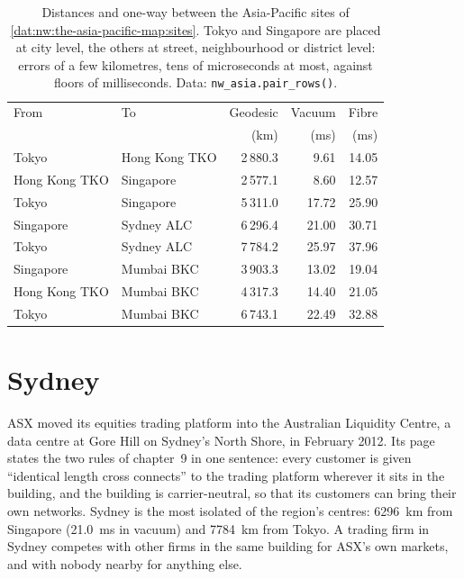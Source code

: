 \begin{table}[ht]
\centering\small
\begin{tabular}{llrrr}
\toprule
From & To & Geodesic & Vacuum & Fibre \\
 & & (km) & (ms) & (ms) \\
\midrule
Tokyo & Hong Kong TKO & 2\,880.3 & 9.61 & 14.05 \\
Hong Kong TKO & Singapore & 2\,577.1 & 8.60 & 12.57 \\
Tokyo & Singapore & 5\,311.0 & 17.72 & 25.90 \\
Singapore & Sydney ALC & 6\,296.4 & 21.00 & 30.71 \\
Tokyo & Sydney ALC & 7\,784.2 & 25.97 & 37.96 \\
Singapore & Mumbai BKC & 3\,903.3 & 13.02 & 19.04 \\
Hong Kong TKO & Mumbai BKC & 4\,317.3 & 14.40 & 21.05 \\
Tokyo & Mumbai BKC & 6\,743.1 & 22.49 & 32.88 \\
\bottomrule
\end{tabular}
\caption{Distances and one-way  between the Asia-Pacific sites of \cref{dat:nw:the-asia-pacific-map:sites}. Tokyo and Singapore
are placed at city level, the others at street, neighbourhood or district level: errors of a few kilometres, tens of microseconds at most, against
floors of milliseconds. Data: \texttt{nw\_asia.pair\_rows()}.}\label{tab:nw:the-asia-pacific-map:pairs}
\end{table}

\section{Sydney}

ASX moved its equities trading platform into the Australian Liquidity Centre, a data centre at Gore Hill on Sydney's North Shore, in
February 2012. Its page states the two rules of chapter~9 in one sentence: every customer is given ``identical length cross connects'' to the
trading platform wherever it sits in the building, and the building is carrier-neutral, so that its customers can bring their own networks.
Sydney is the most isolated of the region's centres: \qty{6296}{\kilo\metre} from Singapore (\qty{21.0}{\milli\second} in vacuum) and
\qty{7784}{\kilo\metre} from Tokyo. A trading firm in Sydney competes with other firms in the same building for ASX's own markets, and with
nobody nearby for anything else.

